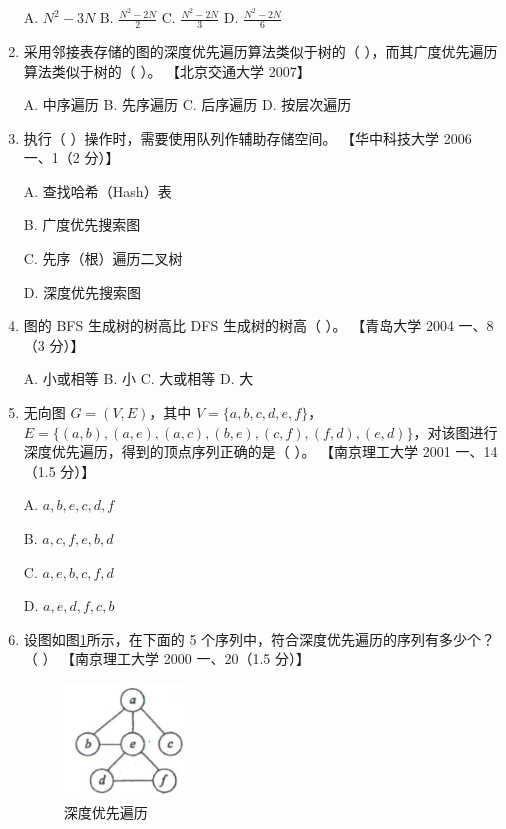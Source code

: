 \documentclass[lang=cn,newtx,10pt,scheme=chinese]{elegantbook}
\begin{document}
\begin{enumerate}
        A. $N^2 - 3N$ \quad B. $\frac{N^2 - 2N}{2}$ \quad C. $\frac{N^2 - 2N}{3}$ \quad D. $\frac{N^2 - 2N}{6}$  
    
        \item 采用邻接表存储的图的深度优先遍历算法类似于树的（ ），而其广度优先遍历算法类似于树的（ ）。  
        【北京交通大学 2007】 

        A. 中序遍历 \quad B. 先序遍历 \quad C. 后序遍历 \quad D. 按层次遍历  

        \item 执行（ ）操作时，需要使用队列作辅助存储空间。  
        【华中科技大学 2006 一、1（2 分）】  

        A. 查找哈希（Hash）表  

        B. 广度优先搜索图  

        C. 先序（根）遍历二叉树  

        D. 深度优先搜索图  
    
        \item 图的 BFS 生成树的树高比 DFS 生成树的树高（ ）。  
        【青岛大学 2004 一、8（3 分）】  

        A. 小或相等 \quad B. 小 \quad C. 大或相等 \quad D. 大  
    
        \item 无向图 $G = (V, E)$，其中 $V = \{a, b, c, d, e, f\}$，$E = \{(a, b), (a, e), (a, c), (b, e), (c, f), (f, d), (e, d)\}$，对该图进行深度优先遍历，得到的顶点序列正确的是（ ）。  
        【南京理工大学 2001 一、14（1.5 分）】 

        A. $a, b, e,c ,d, f$  

        B. $a, c, f, e, b, d$  

        C. $a, e, b, c, f, d$ 

        D. $a, e, d, f, c, b$  
    
        \item 设图如图\ref{fig:7-53}所示，在下面的 5 个序列中，符合深度优先遍历的序列有多少个？（ ）  
        【南京理工大学 2000 一、20（1.5 分）】  

        \begin{figure}[h!]
            \centering
            \includegraphics[width=0.3\textwidth]{./figure/exercisePicPDF/chapter7/7-53.pdf}
            \caption{深度优先遍历}
            \label{fig:7-53}
    \end{figure}


\end{enumerate}
\end{document}

